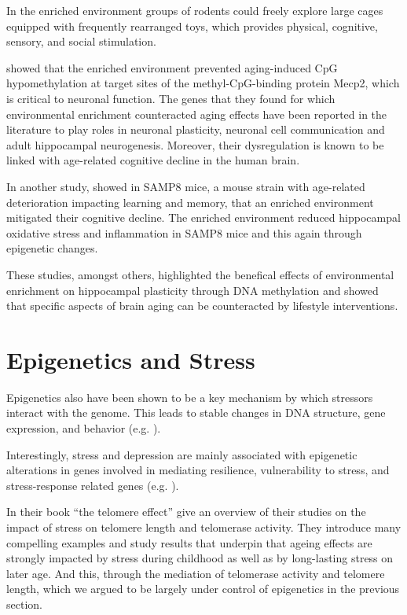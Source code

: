 \documentclass[
  11pt,
]{book}
\begin{document}
In the enriched environment groups of rodents could freely explore large cages equipped with frequently rearranged toys, which provides physical, cognitive, sensory, and social stimulation.

\citet{zocher2021} showed that the enriched environment prevented aging-induced CpG hypomethylation at target sites of the methyl-CpG-binding protein Mecp2, which is critical to neuronal function. The genes that they found for which environmental enrichment counteracted aging effects have been reported in the literature to play roles in neuronal plasticity, neuronal cell communication and adult hippocampal neurogenesis. Moreover, their dysregulation is known to be linked with age-related cognitive decline in the human brain.

In another study, \citet{grinan2016} showed in SAMP8 mice, a mouse strain with age-related deterioration impacting learning and memory, that an enriched environment mitigated their cognitive decline. The enriched environment reduced hippocampal oxidative stress and inflammation in SAMP8 mice and this again through epigenetic changes.

These studies, amongst others, highlighted the benefical effects of environmental enrichment on hippocampal plasticity through DNA methylation and showed that specific aspects of brain aging can be counteracted by lifestyle interventions.

\hypertarget{epigenetics-and-stress}{%
\section{Epigenetics and Stress}\label{epigenetics-and-stress}}

Epigenetics also have been shown to be a key mechanism by which stressors interact with the genome.
This leads to stable changes in DNA structure, gene expression, and behavior (e.g. \citet{Park2019}).

Interestingly, stress and depression are mainly
associated with epigenetic alterations in genes involved in mediating resilience, vulnerability to stress, and stress-response related genes (e.g. \citet{Park2019}).

In their book ``the telomere effect'' \citet{BlackburnEpel2017} give an overview of their studies on the impact of stress on telomere length and telomerase activity.
They introduce many compelling examples and study results that underpin that ageing effects are strongly impacted by stress during childhood as well as by long-lasting stress on later age. And this, through the mediation of telomerase activity and telomere length, which we argued to be largely under control of epigenetics in the previous section.
\end{document}
